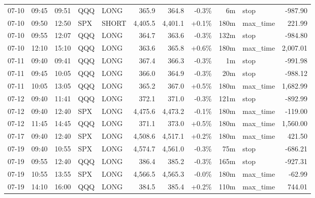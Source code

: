 \documentclass[11pt,a4paper,twoside]{article}
\begin{document}
\begin{center}
\begin{longtable}{>{\color{txtmain}}l l l l l r r r r >{\color{txtmain}}l r}
07-10 & 09:45 & 09:51 & QQQ & LONG & 365.9 & 364.8 & \textcolor{lossred}{-0.3\%} & 6m & stop & \textcolor{lossred}{-987.90} \\
07-10 & 09:50 & 12:50 & SPX & SHORT & 4,405.5 & 4,401.1 & \textcolor{wingreen}{+0.1\%} & 180m & max\_time & \textcolor{wingreen}{221.99} \\
07-10 & 09:55 & 12:07 & QQQ & LONG & 364.7 & 363.6 & \textcolor{lossred}{-0.3\%} & 132m & stop & \textcolor{lossred}{-984.80} \\
07-10 & 12:10 & 15:10 & QQQ & LONG & 363.6 & 365.8 & \textcolor{wingreen}{+0.6\%} & 180m & max\_time & \textcolor{wingreen}{2,007.01} \\
07-11 & 09:40 & 09:41 & QQQ & LONG & 367.4 & 366.3 & \textcolor{lossred}{-0.3\%} & 1m & stop & \textcolor{lossred}{-991.98} \\
07-11 & 09:45 & 10:05 & QQQ & LONG & 366.0 & 364.9 & \textcolor{lossred}{-0.3\%} & 20m & stop & \textcolor{lossred}{-988.12} \\
07-11 & 10:05 & 13:05 & QQQ & LONG & 365.2 & 367.0 & \textcolor{wingreen}{+0.5\%} & 180m & max\_time & \textcolor{wingreen}{1,682.99} \\
07-12 & 09:40 & 11:41 & QQQ & LONG & 372.1 & 371.0 & \textcolor{lossred}{-0.3\%} & 121m & stop & \textcolor{lossred}{-892.99} \\
07-12 & 09:40 & 12:40 & SPX & LONG & 4,475.6 & 4,473.2 & \textcolor{lossred}{-0.1\%} & 180m & max\_time & \textcolor{lossred}{-119.00} \\
07-12 & 11:45 & 14:45 & QQQ & LONG & 371.1 & 373.0 & \textcolor{wingreen}{+0.5\%} & 180m & max\_time & \textcolor{wingreen}{1,560.00} \\
07-17 & 09:40 & 12:40 & SPX & LONG & 4,508.6 & 4,517.1 & \textcolor{wingreen}{+0.2\%} & 180m & max\_time & \textcolor{wingreen}{421.50} \\
07-19 & 09:40 & 10:55 & SPX & LONG & 4,574.7 & 4,561.0 & \textcolor{lossred}{-0.3\%} & 75m & stop & \textcolor{lossred}{-686.21} \\
07-19 & 09:55 & 12:40 & QQQ & LONG & 386.4 & 385.2 & \textcolor{lossred}{-0.3\%} & 165m & stop & \textcolor{lossred}{-927.31} \\
07-19 & 10:55 & 13:55 & SPX & LONG & 4,566.5 & 4,565.3 & \textcolor{lossred}{-0.0\%} & 180m & max\_time & \textcolor{lossred}{-62.99} \\
07-19 & 14:10 & 16:00 & QQQ & LONG & 384.5 & 385.4 & \textcolor{wingreen}{+0.2\%} & 110m & max\_time & \textcolor{wingreen}{744.01} \\

\end{longtable}
\end{center}
\end{document}
